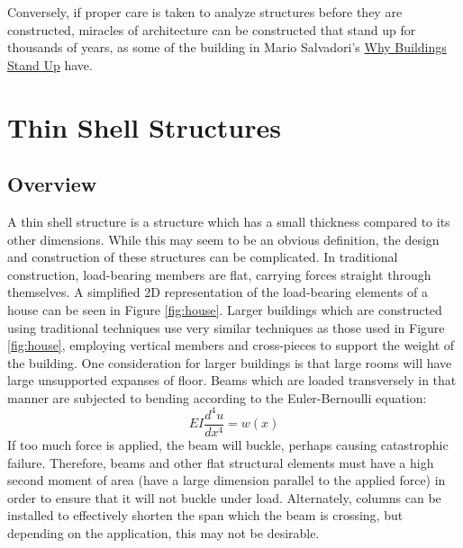 \documentclass{thesis}
\begin{document}
Conversely, if proper care is taken to analyze structures before they are constructed, miracles of architecture can be constructed that stand
up for thousands of years, as some of the building in Mario Salvadori's \underline{Why Buildings Stand Up}\cite{salvadori80standup} have.


\section{Thin Shell Structures} \label{thinshell}

\subsection{Overview}
A thin shell structure is a structure which has a small thickness compared to its other dimensions.  While this may seem to be
an obvious definition, the design and construction of these structures can be complicated.  In traditional construction, load-bearing
members are flat, carrying forces straight through themselves.  A simplified 2D representation of the load-bearing elements of a house
can be seen in Figure \ref{fig:house}.  Larger buildings which are constructed using traditional techniques use very similar techniques
as those used in Figure \ref{fig:house}, employing vertical members and cross-pieces to support the weight of the building.  One
consideration for larger buildings is that large rooms will have large unsupported expanses of floor.  Beams which are loaded transversely
in that manner are subjected to bending according to the Euler-Bernoulli equation: \[EI\frac{d^4u}{dx^4}=w(x)\]
If too much force is applied, the beam will buckle, perhaps causing catastrophic failure.  Therefore, beams and other flat structural
elements must have a high second moment of area (have a large dimension parallel to the applied force) in order to ensure that it will not
buckle under load.  Alternately, columns can be installed to effectively shorten the span which the beam is crossing, but depending on the
application, this may not be desirable.
\end{document}

